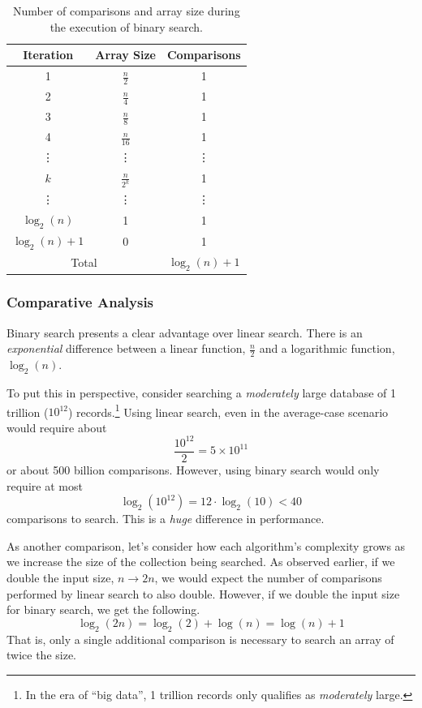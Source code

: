{\renewcommand{\arraystretch}{1.5}
\begin{table}[h]
\centering
\begin{tabular}{c|c|c}
Iteration & Array Size & Comparisons \\
\hline\hline
1 & $\frac{n}{2}$ & 1 \\
2 & $\frac{n}{4}$ & 1 \\
3 & $\frac{n}{8}$ & 1 \\
4 & $\frac{n}{16}$ & 1 \\
\vdots & \vdots & \vdots \\
$k$ & $\frac{n}{2^k}$ & 1 \\
\vdots & \vdots & \vdots \\
$\log_2{(n)}$ & 1 & 1 \\
$\log_2{(n)}+1$ & 0 & 1 \\
\hline
\multicolumn{2}{c|}{Total} & $\log_2{(n)} + 1$ \\
\end{tabular}
\caption{Number of comparisons and array size during the execution of binary search.}
\label{table:binarySearchComparisons}
\end{table}
}

\subsubsection{Comparative Analysis}

Binary search presents a clear advantage over linear search.  There is
an \emph{exponential} difference between a linear function, $\frac{n}{2}$
and a logarithmic function, $\log_2{(n)}$.

To put this in
perspective, consider searching a \emph{moderately} large database of 1
trillion ($10^{12}$) records.\footnote{In the era of ``big data'', 1 trillion
records only qualifies as \emph{moderately} large.}  Using linear search, 
even in the average-case scenario would require about
  $$\frac{10^{12}}{2} = 5 \times 10^11$$
or about 500 billion comparisons.  However, using binary search would only
require at most 
  $$\log_2{(10^{12})} = 12 \cdot \log_2{(10)} < 40$$ 
comparisons to search.  This is a \emph{huge} difference in performance.

As another comparison, let's consider how each algorithm's complexity
grows as we increase the size of the collection being searched.  As observed
earlier, if we double the input size, $n \rightarrow 2n$, we would expect
the number of comparisons performed by linear search to also double.
However, if we double the input size for binary search, we get the following.
  $$\log_2{(2n)} = \log_2{(2)} + \log{(n)} = \log{(n)} + 1$$
That is, only a single additional comparison is necessary to search an array
of twice the size.

